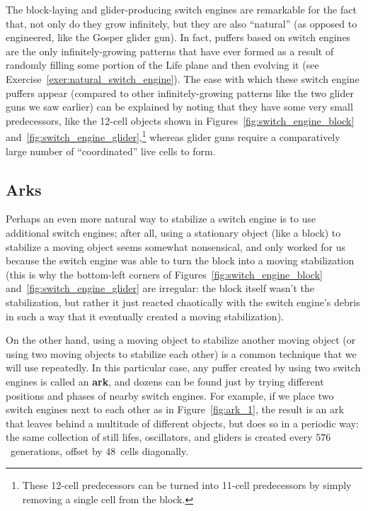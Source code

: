 The block-laying and glider-producing switch engines are remarkable for the fact that, not only do they grow infinitely, but they are also ``natural'' (as opposed to engineered, like the Gosper glider gun). In fact, puffers based on switch engines are the only infinitely-growing patterns that have ever formed as a result of randomly filling some portion of the Life plane and then evolving it (see Exercise~\ref{exer:natural_switch_engine}). The ease with which these switch engine puffers appear (compared to other infinitely-growing patterns like the two glider guns we saw earlier) can be explained by noting that they have some very small predecessors, like the 12-cell objects shown in Figures~\ref{fig:switch_engine_block} and~\ref{fig:switch_engine_glider},\footnote{These 12-cell predecessors can be turned into 11-cell predecessors by simply removing a single cell from the block.} whereas glider guns require a comparatively large number of ``coordinated'' live cells to form.


\subsection{Arks}\label{sec:arks}

Perhaps an even more natural way to stabilize a switch engine is to use additional switch engines; after all, using a stationary object (like a block) to stabilize a moving object seems somewhat nonsensical, and only worked for us because the switch engine was able to turn the block into a moving stabilization (this is why the bottom-left corners of Figures~\ref{fig:switch_engine_block} and~\ref{fig:switch_engine_glider} are irregular: the block itself wasn't the stabilization, but rather it just reacted chaotically with the switch engine's debris in such a way that it eventually created a moving stabilization).

On the other hand, using a moving object to stabilize another moving object (or using two moving objects to stabilize each other) is a common technique that we will use repeatedly. In this particular case, any puffer created by using two switch engines is called an \textbf{ark}, and dozens can be found just by trying different positions and phases of nearby switch engines. For example, if we place two switch engines next to each other as in Figure~\ref{fig:ark_1}, the result is an ark that leaves behind a multitude of different objects, but does so in a periodic way: the same collection of still lifes, oscillators, and gliders is created every $576$~generations, offset by $48$~cells diagonally.

